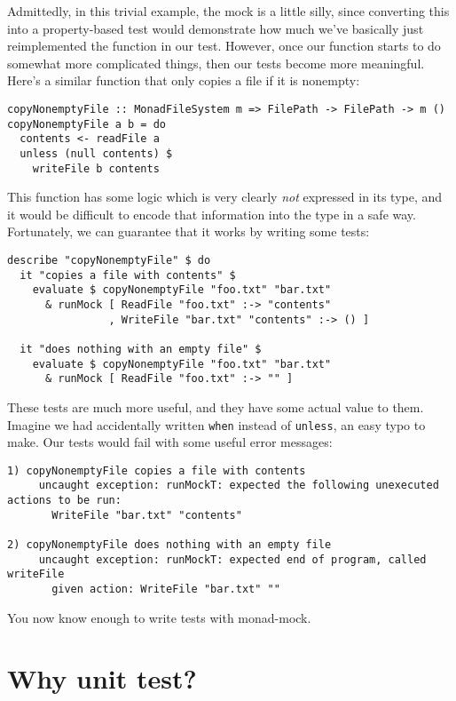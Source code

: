 Admittedly, in this trivial example, the mock is a little silly, since
converting this into a property-based test would demonstrate how much
we've basically just reimplemented the function in our test. However,
once our function starts to do somewhat more complicated things, then
our tests become more meaningful. Here's a similar function that only
copies a file if it is nonempty:

\begin{verbatim}
copyNonemptyFile :: MonadFileSystem m => FilePath -> FilePath -> m ()
copyNonemptyFile a b = do
  contents <- readFile a
  unless (null contents) $
    writeFile b contents
\end{verbatim}
This function has some logic which is very clearly \emph{not} expressed
in its type, and it would be difficult to encode that information into
the type in a safe way. Fortunately, we can guarantee that it works by
writing some tests:

\begin{verbatim}
describe "copyNonemptyFile" $ do
  it "copies a file with contents" $
    evaluate $ copyNonemptyFile "foo.txt" "bar.txt"
      & runMock [ ReadFile "foo.txt" :-> "contents"
                , WriteFile "bar.txt" "contents" :-> () ]

  it "does nothing with an empty file" $
    evaluate $ copyNonemptyFile "foo.txt" "bar.txt"
      & runMock [ ReadFile "foo.txt" :-> "" ]
\end{verbatim}
These tests are much more useful, and they have some actual value to
them. Imagine we had accidentally written \texttt{when} instead of
\texttt{unless}, an easy typo to make. Our tests would fail with some
useful error messages:

\begin{verbatim}
1) copyNonemptyFile copies a file with contents
     uncaught exception: runMockT: expected the following unexecuted actions to be run:
       WriteFile "bar.txt" "contents"

2) copyNonemptyFile does nothing with an empty file
     uncaught exception: runMockT: expected end of program, called writeFile
       given action: WriteFile "bar.txt" ""
\end{verbatim}
You now know enough to write tests with monad-mock.

\hypertarget{why-unit-test}{%
\section{Why unit test?}\label{why-unit-test}}

